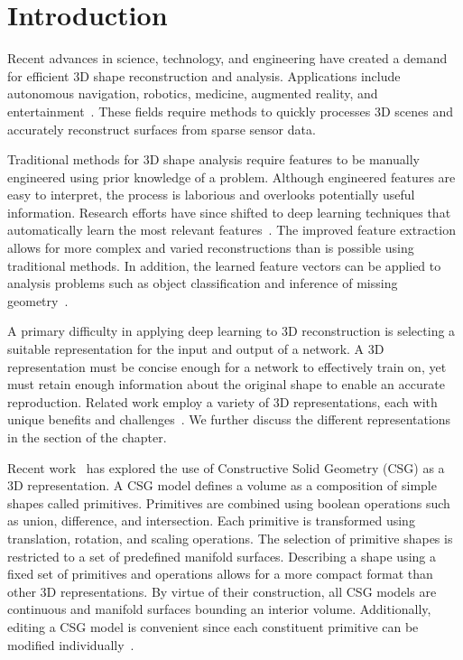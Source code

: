 
\chapter{Introduction}
\label{chap:introduction}

Recent advances in science, technology, and engineering have created a demand for efficient 3D shape reconstruction and analysis. Applications include autonomous navigation, robotics, medicine, augmented reality, and entertainment~\cite{Xiao2020, Xie2022}. These fields require methods to quickly processes 3D scenes and accurately reconstruct surfaces from sparse sensor data.

Traditional methods for 3D shape analysis require features to be manually engineered using prior knowledge of a problem. Although engineered features are easy to interpret, the process is laborious and overlooks potentially useful information. Research efforts have since shifted to deep learning techniques that automatically learn the most relevant features~\cite{Bengio2013}. The improved feature extraction allows for more complex and varied reconstructions than is possible using traditional methods. In addition, the learned feature vectors can be applied to analysis problems such as object classification and inference of missing geometry~\cite{Park2019}.

A primary difficulty in applying deep learning to 3D reconstruction is selecting a suitable representation for the input and output of a network. A 3D representation must be concise enough for a network to effectively train on, yet must retain enough information about the original shape to enable an accurate reproduction. Related work employ a variety of 3D representations, each with unique benefits and challenges~\cite{Xiao2020}. We further discuss the different representations in the  section of the  chapter.

Recent work~\cite{Sharma2018, Kania2020, Ren2021} has explored the use of Constructive Solid Geometry (CSG) as a 3D representation. A CSG model defines a volume as a composition of simple shapes called primitives. Primitives are combined using boolean operations such as union, difference, and intersection. Each primitive is transformed using translation, rotation, and scaling operations. The selection of primitive shapes is restricted to a set of predefined manifold surfaces. Describing a shape using a fixed set of primitives and operations allows for a more compact format than other 3D representations. By virtue of their construction, all CSG models are continuous and manifold surfaces bounding an interior volume. Additionally, editing a CSG model is convenient since each constituent primitive can be modified individually~\cite{Hughes2013}.

